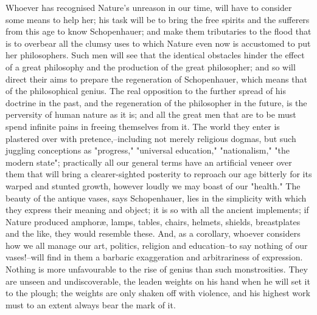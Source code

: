 Whoever has recognised Nature's unreason in our time, will have to
consider some means to help her; his task will be to bring the free
spirits and the sufferers from this age to know Schopenhauer; and
make them tributaries to the flood that is to overbear all the clumsy
uses to which Nature even now is accustomed to put her philosophers.
Such men will see that the identical obstacles hinder the effect of a
great philosophy and the production of the great philosopher; and so
will direct their aims to prepare the regeneration of Schopenhauer,
which means that of the philosophical genius. The real opposition to
the further spread of his doctrine in the past, and the regeneration
of the philosopher in the future, is the perversity of human nature
as it is; and all the great men that are to be must spend infinite
pains in freeing themselves from it. The world they enter is
plastered over with pretence,--including not merely religious dogmas,
but such juggling conceptions as "progress," "universal education,"
"nationalism," "the modern state"; practically all our general terms
have an artificial veneer over them that will bring a clearer-sighted
posterity to reproach our age bitterly for its warped and stunted
growth, however loudly we may boast of our "health." The beauty of
the antique vases, says Schopenhauer, lies in the simplicity with
which they express their meaning and object; it is so with all the
ancient implements; if Nature produced amphoræ, lamps, tables,
chairs, helmets, shields, breastplates and the like, they would
resemble these. And, as a corollary, whoever considers how we all
manage our art, politics, religion and education--to say nothing of
our vases!--will find in them a barbaric exaggeration and
arbitrariness of expression. Nothing is more unfavourable to
the rise of genius than such monstrosities. They are unseen and
undiscoverable, the leaden weights on his hand when he will set it to
the plough; the weights are only shaken off with violence, and his
highest work must to an extent always bear the mark of it.

